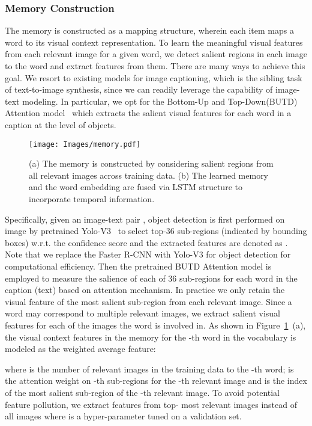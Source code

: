 \documentclass[runningheads]{llncs}
\begin{document}
\subsubsection{Memory Construction}
\label{sec:memory_cons}
The memory is constructed as a mapping structure, wherein each item maps a word to its visual context representation. To learn the meaningful visual features from each relevant image for a given word, we detect salient regions in each image to the word and extract features from them. There are many ways to achieve this goal. We resort to existing models for image captioning, which is the sibling task of text-to-image synthesis, since we can readily leverage the capability of image-text modeling. In particular, we opt for the Bottom-Up and Top-Down(BUTD) Attention model~\cite{anderson2018bottom} which extracts the salient visual features for each word in a caption at the level of objects. 

\begin{figure}[t]
\centering
\texttt{[image: Images/memory.pdf]}
\caption{(a) The memory  is constructed by considering salient regions from all relevant images across training data. (b) The learned memory and the word embedding are fused via LSTM structure to incorporate temporal information.}
\label{fig:memory}
\end{figure}

\noindent Specifically, given an image-text pair , object detection is first performed on image  by pretrained Yolo-V3~\cite{redmon2018yolov3} to select top-36 sub-regions (indicated by bounding boxes) w.r.t. the confidence score and the extracted features are denoted as . Note that we replace the Faster R-CNN with Yolo-V3 for object detection for computational efficiency. Then the pretrained BUTD Attention model is employed to measure the salience of each of 36 sub-regions for each word in the caption (text)  based on attention mechanism. In practice we only retain the visual feature of the most salient sub-region from each relevant image. Since a word may correspond to multiple relevant images, we extract salient visual features for each of the images the word is involved in. As shown in Figure~\ref{fig:memory}\ (a), the visual context features in the memory  for the -th word in the vocabulary is modeled as the weighted average feature: 

\noindent
where  is the number of relevant images in the training data to the -th word;  is the attention weight on -th sub-regions for the -th relevant image and  is the index of the most salient sub-region of the -th relevant image. To avoid potential feature pollution, we extract features from top- most relevant images instead of all  images where  is a hyper-parameter tuned on a validation set.
\end{document}
